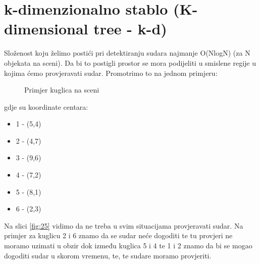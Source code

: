 \section{k-dimenzionalno stablo (K-dimensional tree - k-d)}
Složenost koju želimo postići pri detektiranju sudara najmanje O(NlogN) (za N objekata na sceni). Da bi to postigli prostor se mora podijeliti u smislene regije u kojima ćemo provjeravati sudar. Promotrimo to na jednom primjeru:
\begin{figure}[!http]	
	\begin{center}
	\end{center}
	\caption{Primjer kuglica na sceni}
	\label{fig:26}
\end{figure}\newline
gdje su koordinate centara:\newpage
\begin{itemize}
	\item 1 - (5,4)
	\item 2 - (4,7)
	\item 3 - (9,6)
	\item 4 - (7,2)
	\item 5 - (8,1)
	\item 6 - (2,3)
\end{itemize}
Na slici \ref{fig:25} vidimo da ne treba u svim situacijama provjeravati sudar. Na primjer za kuglicu 2 i 6 znamo da se sudar neće dogoditi te tu provjeri ne moramo uzimati u obzir dok između kuglica 5 i 4 te 1 i 2 znamo da bi se mogao dogoditi sudar u skorom vremenu, te, te sudare moramo provjeriti.

